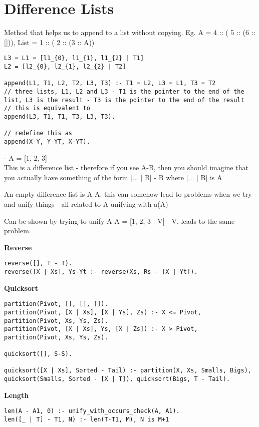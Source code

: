 \documentclass{article}
\begin{document}
\section{Difference Lists}
Method that helps us to append to a list without copying. Eg. A = 4 :: ( 5 :: (6 :: [])), List = 1 :: ( 2 :: (3 :: A))

\begin{lstlisting}
L3 = L1 = [l1_{0}, l1_{1}, l1_{2} | T1]
L2 = [l2_{0}, l2_{1}, l2_{2} | T2]

append(L1, T1, L2, T2, L3, T3) :- T1 = L2, L3 = L1, T3 = T2
// three lists, L1, L2 and L3 - T1 is the pointer to the end of the list, L3 is the result - T3 is the pointer to the end of the result
// this is equivalent to
append(L3, T1, T1, T3, L3, T3).

// redefine this as
append(X-Y, Y-YT, X-YT).
\end{lstlisting}

\bigskip
\noindent
[1, 2, 3 | A] - A = [1, 2, 3]\\
This is a difference list - therefore if you see A-B, then you should imagine that you actually have something of the form [... | B] - B where [... | B] is A

An empty difference list is A-A: this can somehow lead to problems when we try and unify things - all related to A unifying with a(A)

Can be shown by trying to unify A-A = [1, 2, 3 | V] - V, leads to the same problem.

\bigskip
\noindent
\textbf{Reverse}
\begin{lstlisting}
reverse([], T - T).
reverse([X | Xs], Ys-Yt :- reverse(Xs, Rs - [X | Yt]).
\end{lstlisting}

\bigskip
\noindent
\textbf{Quicksort}
\begin{lstlisting}
partition(Pivot, [], [], []).
partition(Pivot, [X | Xs], [X | Ys], Zs) :- X <= Pivot, partition(Pivot, Xs, Ys, Zs).
partition(Pivot, [X | Xs], Ys, [X | Zs]) :- X > Pivot, partition(Pivot, Xs, Ys, Zs).

quicksort([], S-S).

quicksort([X | Xs], Sorted - Tail) :- partition(X, Xs, Smalls, Bigs), quicksort(Smalls, Sorted - [X | T]), quicksort(Bigs, T - Tail).
\end{lstlisting}

\bigskip
\noindent
\textbf{Length}
\begin{lstlisting}
len(A - A1, 0) :- unify_with_occurs_check(A, A1).
len([_ | T] - T1, N) :- len(T-T1, M), N is M+1
\end{lstlisting}
\end{document}
